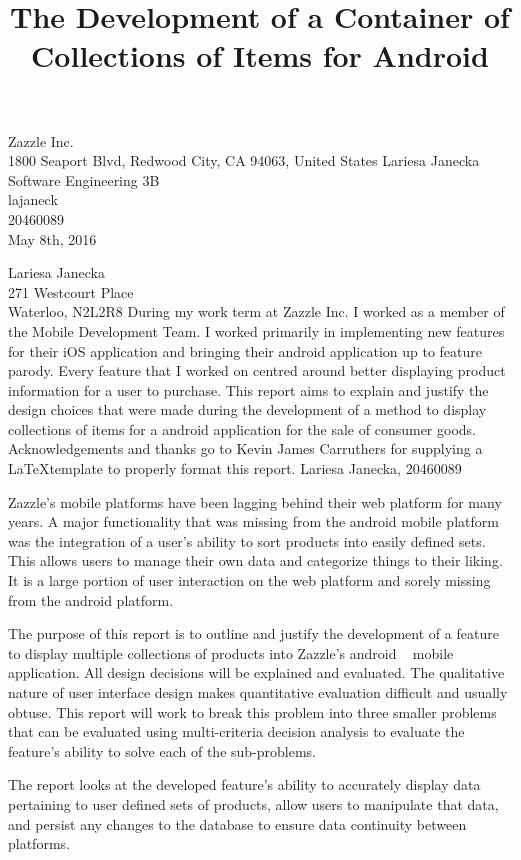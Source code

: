 \documentclass[12pt]{article}
\begin{document}
\title{The Development of a Container of Collections of Items for Android}
{
	Zazzle Inc.\\
	1800 Seaport Blvd, Redwood City, CA 94063, United States
}
{
	Lariesa Janecka\\
	Software Engineering 3B\\
	lajaneck\\
	20460089\\
	May 8th, 2016
}


{
	\noindent
	Lariesa Janecka\\
	271 Westcourt Place\\
	Waterloo, N2L2R8
}
{
	During my work term at Zazzle Inc. I worked as a member of the Mobile Development Team. I worked primarily in implementing new features for their iOS application and bringing their android application up to feature parody. Every feature that I worked on centred around better displaying product information for a user to purchase.
}
{
	This report aims to explain and justify the design choices that were made during the development of a method to display collections of items for a android application for the sale of consumer goods. 	
}
{
	Acknowledgements and thanks go to Kevin James Carruthers for supplying a \LaTeX template to properly format this report.
}
{
	Lariesa Janecka, 20460089
}


Zazzle's mobile platforms have been lagging behind their web platform for many years. A major functionality that was missing from the android mobile platform was the integration of a user's ability to sort products into easily defined sets. This allows users to manage their own data and categorize things to their liking. It is a large portion of user interaction on the web platform and sorely missing from the android platform.

The purpose of this report is to outline and justify the development of a feature to display multiple collections of products into Zazzle's android ~\cite{android} mobile application. All design decisions will be explained and evaluated. The qualitative nature of user interface design makes quantitative evaluation difficult and usually obtuse. This report will work to break this problem into three smaller problems that can be evaluated using multi-criteria decision analysis to evaluate the feature's ability to solve each of the sub-problems. 

The report looks at the developed feature's ability to accurately display data pertaining to user defined sets of products, allow users to manipulate that data, and persist any changes to the database to ensure data continuity between platforms.
\end{document}
